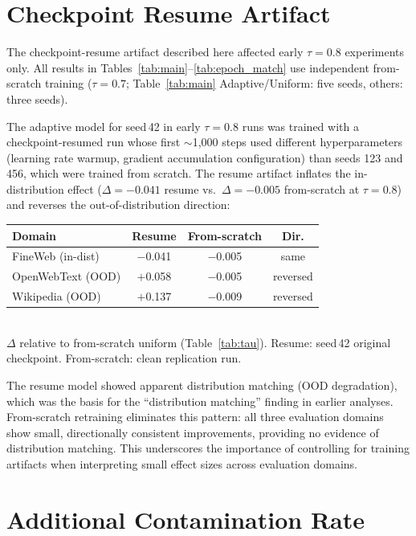 \section{Checkpoint Resume Artifact}
\label{app:resume_artifact}

The checkpoint-resume artifact described here affected early $\tau{=}0.8$ experiments only.
All results in Tables~\ref{tab:main}--\ref{tab:epoch_match} use independent from-scratch training ($\tau{=}0.7$; Table~\ref{tab:main} Adaptive/Uniform: five seeds, others: three seeds).

The adaptive model for seed\,42 in early $\tau{=}0.8$ runs was trained with a checkpoint-resumed run whose first ${\sim}$1{,}000 steps used different hyperparameters (learning rate warmup, gradient accumulation configuration) than seeds 123 and 456, which were trained from scratch.
The resume artifact inflates the in-distribution effect ($\Delta{=}{-}0.041$ resume vs.\ $\Delta{=}{-}0.005$ from-scratch at $\tau{=}0.8$) and reverses the out-of-distribution direction:

\begin{center}
\small
\begin{tabular}{@{}lccc@{}}
\toprule
\textbf{Domain} & \textbf{Resume} & \textbf{From-scratch} & \textbf{Dir.} \\
\midrule
FineWeb (in-dist) & $-$0.041 & $-$0.005 & same \\
OpenWebText (OOD) & $+$0.058 & $-$0.005 & reversed \\
Wikipedia (OOD)   & $+$0.137 & $-$0.009 & reversed \\
\bottomrule
\end{tabular}\\[2pt]
{\scriptsize $\Delta$ relative to from-scratch uniform (Table~\ref{tab:tau}). Resume: seed\,42 original checkpoint. From-scratch: clean replication run.}
\end{center}

The resume model showed apparent distribution matching (OOD degradation), which was the basis for the ``distribution matching'' finding in earlier analyses.
From-scratch retraining eliminates this pattern: all three evaluation domains show small, directionally consistent improvements, providing no evidence of distribution matching.
This underscores the importance of controlling for training artifacts when interpreting small effect sizes across evaluation domains.

\section{Additional Contamination Rate}
\label{app:rho03}

